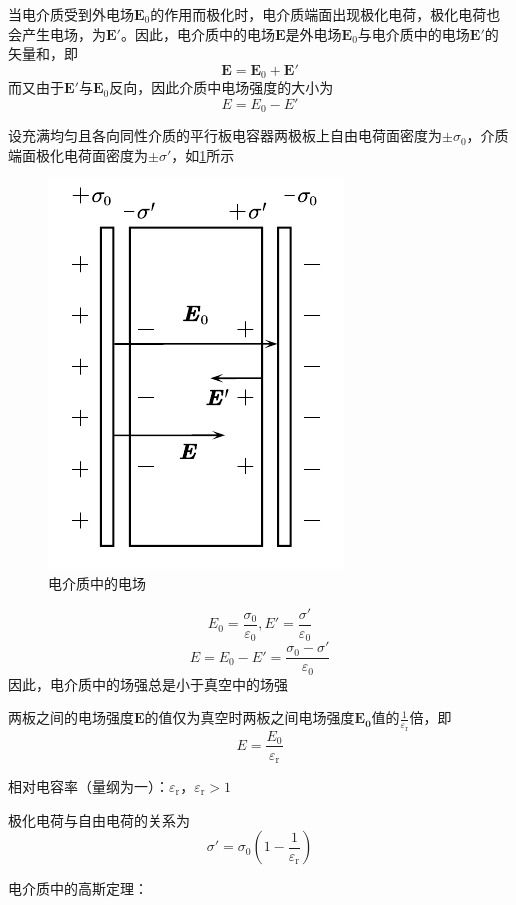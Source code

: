 \documentclass[12pt, a4paper, twoside]{ctexbook}
\begin{document}
当电介质受到外电场$\boldsymbol{E}_0$的作用而极化时，电介质端面出现极化电荷，极化电荷也会产生电场，为$\boldsymbol{E}'$。因此，电介质中的电场$\boldsymbol{E}$是外电场$\boldsymbol{E}_0$与电介质中的电场$\boldsymbol{E}'$的矢量和，即
$$
\boldsymbol{E}=\boldsymbol{E}_0+\boldsymbol{E}'
$$
而又由于$\boldsymbol{E}'$与$\boldsymbol{E}_0$反向，因此介质中电场强度的大小为
$$
E=E_0-E'
$$

设充满均匀且各向同性介质的平行板电容器两极板上自由电荷面密度为$\pm\sigma_0$，介质端面极化电荷面密度为$\pm\sigma'$，如\textcolor{blue}{\cref{fig:电介质中的电场}}所示
\begin{figure}[H]
    \centerline{\includegraphics[scale=1.0]{电介质中的电场.pdf}}
    \caption{电介质中的电场}\label{fig:电介质中的电场}
\end{figure}
$$
E_0=\frac{\sigma_0}{\varepsilon_0},E'=\frac{\sigma'}{\varepsilon_0}
$$
$$
E=E_0-E'=\frac{\sigma_0-\sigma'}{\varepsilon_0}
$$
因此，电介质中的场强总是小于真空中的场强

两板之间的电场强度$\boldsymbol{E}$的值仅为真空时两板之间电场强度$\boldsymbol{E_0}$值的$\frac{1}{\varepsilon_{\mathrm{r}}}$倍，即
$$
E=\frac{E_0}{\varepsilon_{\mathrm{r}}}
$$

{\sonti 相对电容率（量纲为一）}：$\varepsilon_{\mathrm{r}}$，$\varepsilon_{\mathrm{r}}>1$

极化电荷与自由电荷的关系为
$$
\sigma'=\sigma_0\left(1-\frac{1}{\varepsilon_{\mathrm{r}}}\right)
$$

{\sonti 电介质中的高斯定理}：
\end{document}
